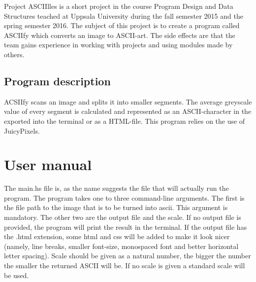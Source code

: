 \documentclass[12pt, a4paper]{article}
\begin{document}
		Project ASCIIlles is a short project in the course Program Design and Data Structures teached at Uppsala University during the fall semester 2015 and the spring semester 2016. The subject of this project is to create a program called ASCIIfy which converts an image to ASCII-art. The side effects are that the team gains experience in working with projects and using modules made by others.


		\subsection{Program description }

		ACSIIfy scans an image and splits it into smaller segments. The average greyscale value of every segment is calculated and represented as an ASCII-character in the exported into the terminal or as a HTML-file. This program relies on the use of JuicyPixels.


	\section{User manual}

	The main.hs file is, as the name suggests the file that will actually run the program. The program takes one to three command-line arguments. The first is the file path to the image that is to be turned into ascii. This argument is mandatory. The other two are the output file and the scale. If no output file is provided, the program will print the result in the terminal. If the output file has the .html extension, some html and css will be added to make it look nicer (namely, line breaks, smaller font-size, monospaced font and better horizontal letter spacing). Scale should be given as a natural number, the bigger the number the smaller the returned ASCII will be. If no scale is given a standard scale will be used.
\end{document}
